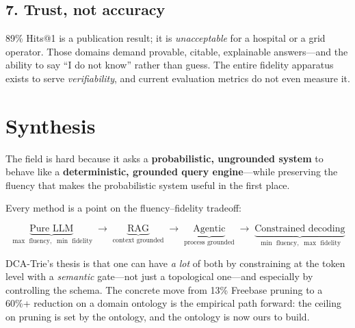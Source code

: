 \documentclass[11pt,a4paper]{article}
\begin{document}
\subsection{7. Trust, not accuracy}
89\% Hits@1 is a publication result; it is \emph{unacceptable} for a
hospital or a grid operator.  Those domains demand provable, citable,
explainable answers---and the ability to say ``I do not know'' rather
than guess.  The entire fidelity apparatus exists to serve
\emph{verifiability}, and current evaluation metrics do not even
measure it.

\section{Synthesis}

The field is hard because it asks a \textbf{probabilistic, ungrounded
system} to behave like a \textbf{deterministic, grounded query
engine}---while preserving the fluency that makes the probabilistic
system useful in the first place.

Every method is a point on the fluency--fidelity tradeoff:

\[
  \underbrace{\text{Pure LLM}}_{\max \text{ fluency},\; \min \text{ fidelity}}
  \;\longrightarrow\;
  \underbrace{\text{RAG}}_{\text{context grounded}}
  \;\longrightarrow\;
  \underbrace{\text{Agentic}}_{\text{process grounded}}
  \;\longrightarrow\;
  \underbrace{\text{Constrained decoding}}_{\min \text{ fluency},\; \max \text{ fidelity}}
\]

DCA-Trie's thesis is that one can have \emph{a lot} of both by
constraining at the token level with a \emph{semantic} gate---not just
a topological one---and especially by controlling the schema.  The
concrete move from 13\% Freebase pruning to a 60\%+ reduction on a
domain ontology is the empirical path forward: the ceiling on
pruning is set by the ontology, and the ontology is now ours to build.
\end{document}
